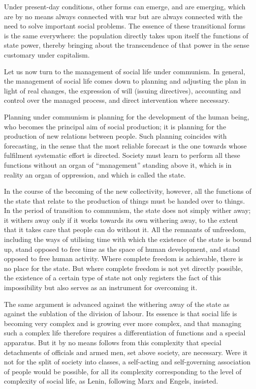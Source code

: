 \documentclass[12pt,a4paper,openany]{book}
\begin{document}
Under present-day conditions, other forms can emerge, and are emerging, which are by no means always connected with war but are always connected with the need to solve important social problems. The essence of these transitional forms is the same everywhere: the population directly takes upon itself the functions of state power, thereby bringing about the transcendence of that power in the sense customary under capitalism.

Let us now turn to the management of social life under communism. In general, the management of social life comes down to planning and adjusting the plan in light of real changes, the expression of will (issuing directives), accounting and control over the managed process, and direct intervention where necessary.

Planning under communism is planning for the development of the human being, who becomes the principal aim of social production; it is planning for the production of new relations between people. Such planning coincides with forecasting, in the sense that the most reliable forecast is the one towards whose fulfilment systematic effort is directed. Society must learn to perform all these functions without an organ of “management” standing above it, which is in reality an organ of oppression, and which is called the state.

In the course of the becoming of the new collectivity, however, all the functions of the state that relate to the production of things must be handed over to things. In the period of transition to communism, the state does not simply wither away; it withers away only if it works towards its own withering away, to the extent that it takes care that people can do without it. All the remnants of unfreedom, including the ways of utilising time with which the existence of the state is bound up, stand opposed to free time as the space of human development, and stand opposed to free human activity. Where complete freedom is achievable, there is no place for the state. But where complete freedom is not yet directly possible, the existence of a certain type of state not only registers the fact of this impossibility but also serves as an instrument for overcoming it.

The same argument is advanced against the withering away of the state as against the sublation of the division of labour. Its essence is that social life is becoming very complex and is growing ever more complex, and that managing such a complex life therefore requires a differentiation of functions and a special apparatus. But it by no means follows from this complexity that special detachments of officials and armed men, set above society, are necessary. Were it not for the split of society into classes, a self-acting and self-governing association of people would be possible, for all its complexity corresponding to the level of complexity of social life, as Lenin, following Marx and Engels, insisted.
\end{document}
